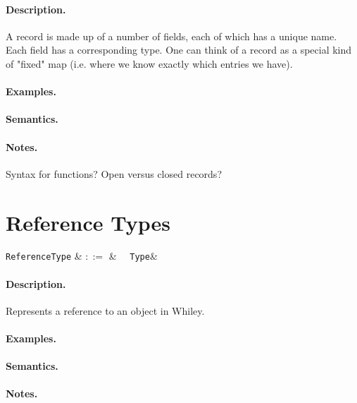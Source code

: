 \paragraph{Description.}   A record is made up of a number of fields,
each of which has a unique name. Each field has a corresponding
type. One can think of a record as a special kind of "fixed" map
(i.e. where we know exactly which entries we have).

\paragraph{Examples.}

\paragraph{Semantics.}

\paragraph{Notes.}  Syntax for functions?  Open versus closed records?


\section{Reference Types}

\begin{syntax}
  \verb+ReferenceType+ & $::=$ & \token{\&}\ \ \verb+Type+&\\
\end{syntax}

\paragraph{Description.}  Represents a reference to an object in Whiley.

\paragraph{Examples.}

\paragraph{Semantics.}

\paragraph{Notes.}

